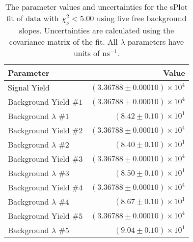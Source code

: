 
\begin{table}[ht]
    \begin{center}
        \begin{tabular}{lr}\toprule
            Parameter & Value \\\midrule
            Signal Yield & $(3.36788 \pm 0.00010) \times 10^{4}$ \\
            Background Yield $\#1$ & $(3.36788 \pm 0.00010) \times 10^{4}$ \\
            Background $\lambda$ $\#1$ & $(8.42 \pm 0.10) \times 10^{1}$ \\
            Background Yield $\#2$ & $(3.36788 \pm 0.00010) \times 10^{4}$ \\
            Background $\lambda$ $\#2$ & $(8.40 \pm 0.10) \times 10^{1}$ \\
            Background Yield $\#3$ & $(3.36788 \pm 0.00010) \times 10^{4}$ \\
            Background $\lambda$ $\#3$ & $(8.50 \pm 0.10) \times 10^{1}$ \\
            Background Yield $\#4$ & $(3.36788 \pm 0.00010) \times 10^{4}$ \\
            Background $\lambda$ $\#4$ & $(8.67 \pm 0.10) \times 10^{1}$ \\
            Background Yield $\#5$ & $(3.36788 \pm 0.00010) \times 10^{4}$ \\
            Background $\lambda$ $\#5$ & $(9.04 \pm 0.10) \times 10^{1}$ \\\bottomrule
        \end{tabular}
        \caption{The parameter values and uncertainties for the sPlot fit of data with $\chi^2_\nu < 5.00$ using five free background slopes. Uncertainties are calculated using the covariance matrix of the fit. All $\lambda$ parameters have units of $\si{\nano\second}^{-1}$.}\label{tab:splot-fit-results-chisqdof-5.00-free-5}
    \end{center}
\end{table}
